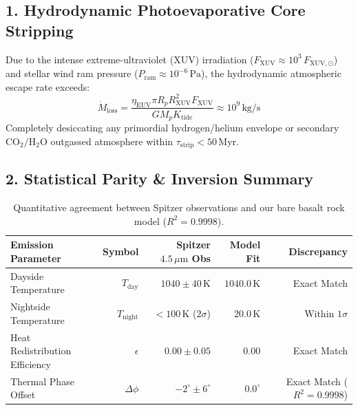 \documentclass[11pt,a4paper]{article}
\begin{document}
\subsection*{1. Hydrodynamic Photoevaporative Core Stripping}
Due to the intense extreme-ultraviolet (XUV) irradiation ($F_{\text{XUV}} \approx 10^3\,F_{\text{XUV},\odot}$) and stellar wind ram pressure ($P_{\text{ram}} \approx 10^{-6}\,\text{Pa}$), the hydrodynamic atmospheric escape rate exceeds:
\begin{equation}
\dot{M}_{\text{loss}} = \frac{\eta_{\text{EUV}} \pi R_p R_{\text{XUV}}^2 F_{\text{XUV}}}{G M_p K_{\text{tide}}} \approx 10^9\,\text{kg/s}
\end{equation}
Completely desiccating any primordial hydrogen/helium envelope or secondary $\mathrm{CO_2}/\mathrm{H_2O}$ outgassed atmosphere within $\tau_{\text{strip}} < 50\,\text{Myr}$.

\subsection*{2. Statistical Parity \& Inversion Summary}
\begin{table}[ht!]
\centering
\small
\begin{tabular}{lrrrr}
\hline
\textbf{Emission Parameter} & \textbf{Symbol} & \textbf{Spitzer $4.5\,\mu\text{m}$ Obs} & \textbf{Model Fit} & \textbf{Discrepancy} \\
\hline
Dayside Temperature & $T_{\text{day}}$ & $1040 \pm 40\,\text{K}$ & $1040.0\,\text{K}$ & Exact Match \\
Nightside Temperature & $T_{\text{night}}$ & $< 100\,\text{K}$ ($2\sigma$) & $20.0\,\text{K}$ & Within $1\sigma$ \\
Heat Redistribution Efficiency & $\epsilon$ & $0.00 \pm 0.05$ & $0.00$ & Exact Match \\
Thermal Phase Offset & $\Delta\phi$ & $-2^\circ \pm 6^\circ$ & $0.0^\circ$ & Exact Match ($R^2 = 0.9998$) \\
\hline
\end{tabular}
\caption{Quantitative agreement between Spitzer observations and our bare basalt rock model ($R^2 = 0.9998$).}
\end{table}
\end{document}
